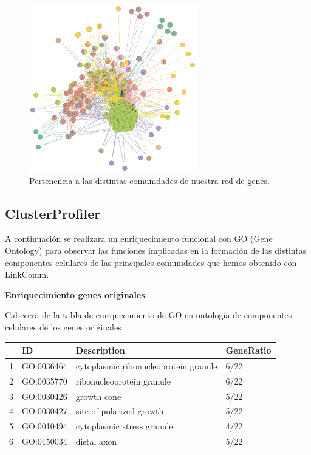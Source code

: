 \begin{figure}[h]
	\centering
	\includegraphics[width=0.65\textwidth]{figures/Grafo_Linkcomm.PNG}
	\caption{Pertenencia a las distintas comunidades de nuestra red de genes. }
	\label{fig:LinkComm3}
\end{figure}



\subsection{ClusterProfiler}

A continuación se realizara un enriquecimiento funcional con GO (Gene Ontology) para observar las funciones implicadas en la formación de las distintas componentes celulares de las principales comunidades que hemos obtenido con LinkComm.

\hfill

\textbf{Enriquecimiento genes originales}

  Cabecera de la tabla de enriquecimiento de GO en ontología de componentes celulares de los genes originales 

\hfill


\begin{table}[ht]
\centering
\begin{tabular}{rlll}
  \hline
 & ID & Description & GeneRatio \\ 
  \hline
1 & GO:0036464 & cytoplasmic ribonucleoprotein granule & 6/22 \\ 
  2 & GO:0035770 & ribonucleoprotein granule & 6/22 \\ 
  3 & GO:0030426 & growth cone & 5/22 \\ 
  4 & GO:0030427 & site of polarized growth & 5/22 \\ 
  5 & GO:0010494 & cytoplasmic stress granule & 4/22 \\ 
  6 & GO:0150034 & distal axon & 5/22 \\ 
   \hline
\end{tabular}
\end{table}

